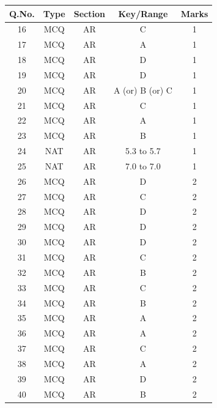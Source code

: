 \documentclass{article}
\begin{document}
\newpage
\renewcommand{\arraystretch}{2.2} %
\setlength{\tabcolsep}{20pt} %
\hspace{1.5cm}
\begin{tabular}{|c|c|c|c|c|}
\hline
\rowcolor{orange!30}
Q.No. & Type & Section & Key/Range & Marks \\
\hline
16 & MCQ & AR & C & 1 \\
\hline
17 & MCQ & AR & A & 1 \\
\hline
18 & MCQ & AR & D & 1 \\
\hline
19 & MCQ & AR & D & 1 \\
\hline
20 & MCQ & AR & A (or) B (or) C & 1 \\
\hline
21 & MCQ & AR & C & 1 \\
\hline
22 & MCQ & AR & A & 1 \\
\hline
23 & MCQ & AR & B & 1 \\
\hline
24 & NAT & AR & 5.3 to 5.7 & 1 \\
\hline
25 & NAT & AR & 7.0 to 7.0 & 1 \\
\hline
26 & MCQ & AR & D & 2 \\
\hline
27 & MCQ & AR & C & 2 \\
\hline
28 & MCQ & AR & D & 2 \\
\hline
29 & MCQ & AR & D & 2 \\
\hline
30 & MCQ & AR & D & 2 \\
\hline
31 & MCQ & AR & C & 2 \\
\hline
32 & MCQ & AR & B & 2 \\
\hline
33 & MCQ & AR & C & 2 \\
\hline
34 & MCQ & AR & B & 2 \\
\hline
35 & MCQ & AR & A & 2 \\
\hline
36 & MCQ & AR & A & 2 \\
\hline
37 & MCQ & AR & C & 2 \\
\hline
38 & MCQ & AR & A & 2 \\
\hline
39 & MCQ & AR & D & 2 \\
\hline
40 & MCQ & AR & B & 2 \\
\hline
\end{tabular}

\newpage
\end{document}
